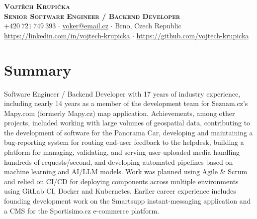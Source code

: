 \documentclass[letterpaper,11pt]{article}
\begin{document}


    \textbf{\Huge \scshape Vojtěch Krupička} \\ \vspace{6pt} 
    \textbf{\Large \scshape Senior Software Engineer / Backend Developer} \\ \vspace{4pt} 
    \small $+420\ 721\ 749\ 393$ $\cdot$ \href{mailto:voker@email.cz}{voker@email.cz} $\cdot$ Brno, Czech Republic \\
    \href{https://linkedin.com/in/vojtech-krupicka}{https://linkedin.com/in/vojtech-krupicka} $\cdot$ \href{https://github.com/vojtech-krupicka}{https://github.com/vojtech-krupicka}   


\section{Summary}
{Software Engineer / Backend Developer with 17 years of industry experience, including nearly 14 years as a member of the development team for Seznam.cz's Mapy.com (formerly Mapy.cz) map application. Achievements, among other projects, included working with large volumes of geospatial data, contributing to the development of software for the Panorama Car, developing and maintaining a bug-reporting system for routing end-user feedback to the helpdesk, building a platform for managing, validating, and serving user-uploaded media handling hundreds of requests/second, and developing automated pipelines based on machine learning and AI/LLM models. Work was planned using Agile \& Scrum and relied on CI/CD for deploying components across multiple environments using GitLab CI, Docker and Kubernetes. Earlier career experience includes founding development work on the Smartsupp instant-messaging application and a CMS for the Sportisimo.cz e-commerce platform.}
\end{document}
